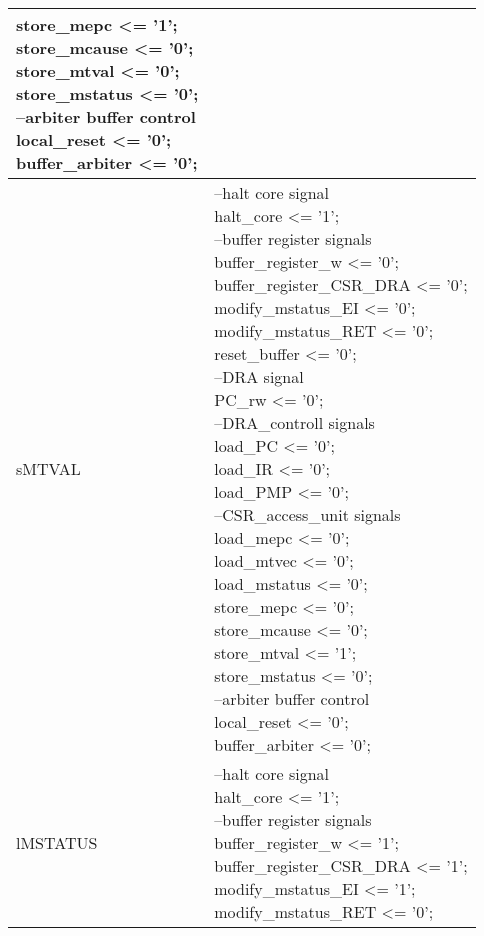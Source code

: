 \begin{longtable}{| p{} | p{} |}
{		store\_mepc <= '1';\\
		store\_mcause <= '0';\\
		store\_mtval <= '0';\\
		store\_mstatus <= '0';\\
		--arbiter buffer control\\
		local\_reset <= '0';\\
		buffer\_arbiter <= '0';} \\
	\hline
	sMTVAL & \makecell{--halt core signal\\
		halt\_core <= '1';\\
		--buffer register signals\\
		buffer\_register\_w <= '0';\\
		buffer\_register\_CSR\_DRA <= '0';\\
		modify\_mstatus\_EI <= '0';\\
		modify\_mstatus\_RET <= '0';\\
		reset\_buffer <= '0';\\
		--DRA signal\\
		PC\_rw <= '0';\\
		--DRA\_controll signals\\
		load\_PC <= '0';\\
		load\_IR <= '0';\\
		load\_PMP <= '0';\\
		--CSR\_access\_unit signals\\
		load\_mepc <= '0';\\
		load\_mtvec <= '0';\\
		load\_mstatus <= '0';\\
		store\_mepc <= '0';\\
		store\_mcause <= '0';\\
		store\_mtval <= '1';\\
		store\_mstatus <= '0';\\
		--arbiter buffer control\\
		local\_reset <= '0';\\
		buffer\_arbiter <= '0';} \\
	\hline
	lMSTATUS & \makecell{--halt core signal\\
		halt\_core <= '1';\\
		--buffer register signals\\
		buffer\_register\_w <= '1';\\
		buffer\_register\_CSR\_DRA <= '1';\\
		modify\_mstatus\_EI <= '1';\\
		modify\_mstatus\_RET <= '0';\\
}
\end{longtable}
